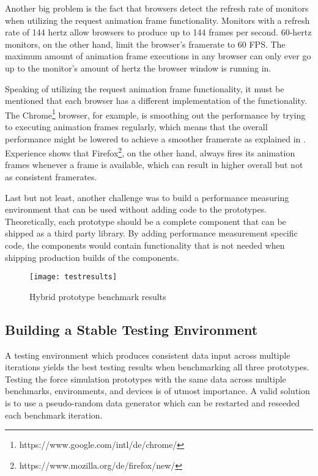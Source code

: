 Another big problem is the fact that browsers detect the refresh rate of monitors when utilizing the request animation frame functionality. Monitors with a refresh rate of 144 hertz allow browsers to produce up to 144 frames per second. 60-hertz monitors, on the other hand, limit the browser's framerate to 60 FPS. The maximum amount of animation frame executions in any browser can only ever go up to the monitor's amount of hertz the browser window is running in. 

Speaking of utilizing the request animation frame functionality, it must be mentioned that each browser has a different implementation of the functionality. The Chrome\footnote{https://www.google.com/intl/de/chrome/} browser, for example, is smoothing out the performance by trying to executing animation frames regularly, which means that the overall performance might be lowered to achieve a smoother framerate as explained in \cite{ChromeRAF}. Experience shows that Firefox\footnote{https://www.mozilla.org/de/firefox/new/}, on the other hand, always fires its animation frames whenever a frame is available, which can result in higher overall but not as consistent framerates.

Last but not least, another challenge was to build a performance measuring environment that can be used without adding code to the prototypes. Theoretically, each prototype should be a complete component that can be shipped as a third party library. By adding performance measurement specific code, the components would contain functionality that is not needed when shipping production builds of the components.

\begin{figure}
  \centering
  \texttt{[image: testresults]}
  \caption{Hybrid prototype benchmark results}
  \label{fig:reactD3benchResult}
\end{figure}

\subsection{Building a Stable Testing Environment}
\label{sub:perfImplDetails}

A testing environment which produces consistent data input across multiple iterations yields the best testing results when benchmarking all three prototypes. Testing the force simulation prototypes with the same data across multiple benchmarks, environments, and devices is of utmost importance. A valid solution is to use a pseudo-random data generator which can be restarted and reseeded each benchmark iteration.

